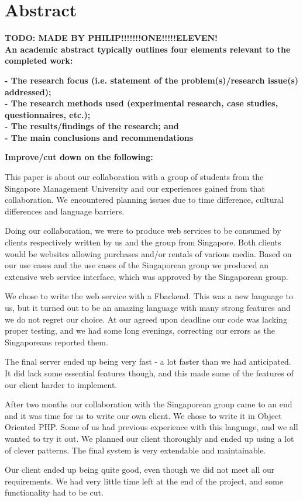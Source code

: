 \section*{Abstract}

\textbf{TODO: MADE BY PHILIP!!!!!!!ONE!!!!!ELEVEN!}\\
\textbf{An academic abstract typically outlines four elements relevant to the completed work:}

    \textbf{- The research focus (i.e. statement of the problem(s)/research issue(s) addressed);}\\
    \textbf{- The research methods used (experimental research, case studies, questionnaires, etc.);}\\
    \textbf{- The results/findings of the research; and}\\
    \textbf{ - The main conclusions and recommendations}
    
\textbf{Improve/cut down on the following:}

This paper is about our collaboration with a group of students from the Singapore Management University and our experiences gained from that collaboration. We encountered planning issues due to time difference, cultural differences and language barriers.

Doing our collaboration, we were to produce web services to be consumed by clients respectively written by us and the group from Singapore. Both clients would be websites allowing purchases and/or rentals of various media.
Based on our use cases and the use cases of the Singaporean group we produced an extensive web service interface, which was approved by the Singaporean group. 

We chose to write the web service with a F\Sh backend. This was a new language to us, but it turned out to be an amazing language with many strong features and we do not regret our choice.
At our agreed upon deadline our code was lacking proper testing, and we had some long evenings, correcting our errors as the Singaporeans reported them.

The final server ended up being very fast - a lot faster than we had anticipated. It did lack some essential features though, and this made some of the features of our client harder to implement.

After two months our collaboration with the Singaporean group came to an end and it was time for us to write our own client. We chose to write it in Object Oriented PHP. Some of us had previous experience with this language, and we all wanted to try it out. We planned our client thoroughly and ended up using a lot of clever patterns. The final system is very extendable and maintainable.

Our client ended up being quite good, even though we did not meet all our requirements. We had very little time left at the end of the project, and some functionality had to be cut.
\newpage
